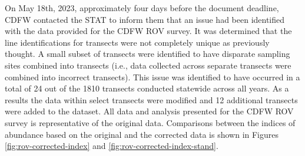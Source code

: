 \documentclass[11pt,
  english,
  letterpaper,
]{article}
\begin{document}
On May 18th, 2023, approximately four days before the document deadline, CDFW contacted the STAT to inform them that an issue had been identified with the data provided for the CDFW ROV survey. It was determined that the line identifications for transects were not completely unique as previously thought. A small subset of transects were identified to have disparate sampling sites combined into transects (i.e., data collected across separate transects were combined into incorrect transects). This issue was identified to have occurred in a total of 24 out of the 1810 transects conducted statewide across all years. As a results the data within select transects were modified and 12 additional transects were added to the dataset. All data and analysis presented for the CDFW ROV survey is representative of the original data. Comparisons between the indices of abundance based on the original and the corrected data is shown in Figures \ref{fig:rov-corrected-index} and \ref{fig:rov-corrected-index-stand}.

\newpage



\newpage

\begingroup\fontsize{10}{12}\selectfont
\begingroup\fontsize{10}{12}\selectfont
\end{document}

